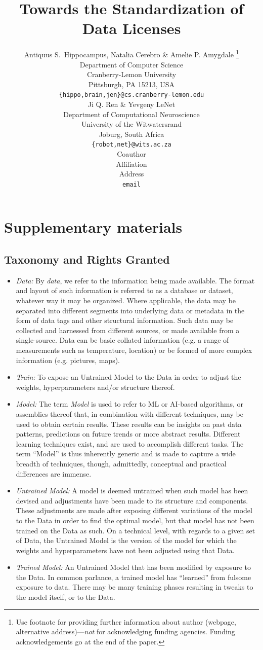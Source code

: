 \documentclass{article} %
\title{Towards the Standardization of Data Licenses}
\author{Antiquus S.~Hippocampus, Natalia Cerebro \& Amelie P. Amygdale \thanks{ Use footnote for providing further information
about author (webpage, alternative address)---\emph{not} for acknowledging
funding agencies.  Funding acknowledgements go at the end of the paper.} \\
Department of Computer Science\\
Cranberry-Lemon University\\
Pittsburgh, PA 15213, USA \\
\texttt{\{hippo,brain,jen\}@cs.cranberry-lemon.edu} \\
\And
Ji Q. Ren \& Yevgeny LeNet \\
Department of Computational Neuroscience \\
University of the Witwatersrand \\
Joburg, South Africa \\
\texttt{\{robot,net\}@wits.ac.za} \\
\AND
Coauthor \\
Affiliation \\
Address \\
\texttt{email}
}
\begin{document}
\maketitle
\section{Supplementary materials}
\subsection{Taxonomy and Rights Granted}
\begin{itemize}
    \item \textit{Data:} By \textit{data}, we refer to the information being made available. The format and layout of such information is referred to as a database or dataset, whatever way it may be organized. Where applicable, the data may be separated into different segments into underlying data or metadata in the form of data tags and other structural information. Such data may be collected and harnessed from different sources, or made available from a single-source. Data can be basic collated information (e.g. a range of measurements such as temperature, location) or be formed of more complex information (e.g. pictures, maps).
    \item \textit{Train:} To expose an Untrained Model to the Data in order to adjust the weights, hyperparameters  and/or structure thereof.
    
    \item \textit{Model:} The term \textit{Model} is used to refer to ML or AI-based algorithms, or assemblies thereof that, in combination with different techniques, may be used to obtain certain results. These results can be insights on past data patterns, predictions on future trends or more abstract results. Different learning techniques exist, and are used to accomplish different tasks. The term “Model” is thus inherently generic and is made to capture a wide breadth of techniques, though, admittedly, conceptual and practical differences are immense.

    \item \textit{Untrained Model:} A model is deemed untrained when such model has been devised and adjustments have been made to its structure and components. These adjustments are made after exposing different variations of the model to the Data in order to find the optimal model, but that model has not been trained on the Data as such. On a technical level, with regards to a given set of Data, the Untrained Model is the version of the model for which the weights and hyperparameters have not been adjusted using that Data. 
    \item \textit{Trained Model:} An Untrained Model that has been modified by exposure to the Data. In common parlance, a trained model has “learned” from fulsome exposure to data. There may be many training phases resulting in tweaks to the model itself, or to the Data. 
    

\end{itemize}
\end{document}
